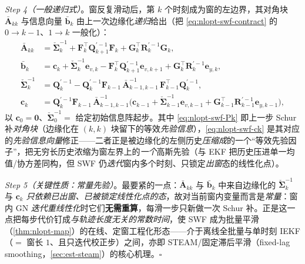 \begin{derivation}
\emph{Step 4（一般递归式）}。窗反复滑动后，第 $k$ 个时刻成为窗的左边界，其对角块 $\bar{\mathbf{A}}_{kk}$ 与信息向量 $\bar{\mathbf{b}}_k$ 由上一次边缘化\emph{递归}给出（把 \cref{eq:nlopt-swf-contract} 的 $0\to k{-}1$、$1\to k$ 一般化）：
\begin{subequations}\label{eq:nlopt-swf-rec}
\begin{align}
\bar{\mathbf{A}}_{kk} &= \check{\boldsymbol{\Sigma}}_k^{-1}+\mathbf{F}_k^\top\mathbf{Q}_{k+1}^{\prime-1}\mathbf{F}_k+\mathbf{G}_k^\top\mathbf{R}_k^{\prime-1}\mathbf{G}_k, \label{eq:nlopt-swf-Akk}\\
\bar{\mathbf{b}}_k &= \mathbf{c}_k+\check{\boldsymbol{\Sigma}}_k^{-1}\mathbf{e}_{v,k}-\mathbf{F}_k^\top\mathbf{Q}_{k+1}^{\prime-1}\mathbf{e}_{v,k+1}+\mathbf{G}_k^\top\mathbf{R}_k^{\prime-1}\mathbf{e}_{y,k}, \label{eq:nlopt-swf-bk}\\
\check{\boldsymbol{\Sigma}}_k^{-1} &= \mathbf{Q}_k^{\prime-1}-\mathbf{Q}_k^{\prime-1}\mathbf{F}_{k-1}\,\bar{\mathbf{A}}_{k-1,k-1}^{-1}\,\mathbf{F}_{k-1}^\top\mathbf{Q}_k^{\prime-1}, \label{eq:nlopt-swf-Pk}\\
\mathbf{c}_k &= \mathbf{Q}_k^{\prime-1}\mathbf{F}_{k-1}\,\bar{\mathbf{A}}_{k-1,k-1}^{-1}\Big(\mathbf{c}_{k-1}+\check{\boldsymbol{\Sigma}}_{k-1}^{-1}\mathbf{e}_{v,k-1}+\mathbf{G}_{k-1}^\top\mathbf{R}_{k-1}^{\prime-1}\mathbf{e}_{y,k-1}\Big), \label{eq:nlopt-swf-ck}
\end{align}
\end{subequations}
以 $\mathbf{c}_0=\mathbf{0}$、$\check{\boldsymbol{\Sigma}}_0^{-1}=$ 给定初始信息阵起步。其中 \cref{eq:nlopt-swf-Pk} 即上一步 Schur 补\emph{对角块}（边缘化在 $(k,k)$ 块留下的等效\emph{先验信息}），\cref{eq:nlopt-swf-ck} 是其对应的\emph{先验信息向量}修正——二者正是被边缘化的左侧历史\emph{压缩成}的一个“等效先验因子”，把无穷长历史浓缩为窗左界上的\emph{一个}高斯先验（与 EKF 把历史压进单一均值/协方差同构，但 SWF 仍\emph{迭代}窗内多个时刻、只锁定\emph{出窗}态的线性化点）。

\emph{Step 5（关键性质：常量先验）}。最要紧的一点：$\bar{\mathbf{A}}_{kk}$ 与 $\bar{\mathbf{b}}_k$ 中来自边缘化的 $\check{\boldsymbol{\Sigma}}_k^{-1}$ 与 $\mathbf{c}_k$ \emph{只依赖已出窗、已被锁定线性化点的态}，故对当前窗内变量而言是\emph{常量}：窗内 GN \emph{迭代重线性化}时它们\textbf{无需重算}，每滑一步只新做一次 Schur 补。正是这一点把每步代价钉成\emph{与轨迹长度无关的常数时间}，使 SWF 成为批量平滑（\cref{thm:nlopt-map}）的在线、定窗工程化形态——介于离线全批量与单时刻 IEKF（$=$ 窗长 $1$、且只迭代校正步）之间，亦即 STEAM/固定滞后平滑（fixed-lag smoothing，\cref{sec:est-steam}）的核心机理。\hfill$\square$
\end{derivation}

